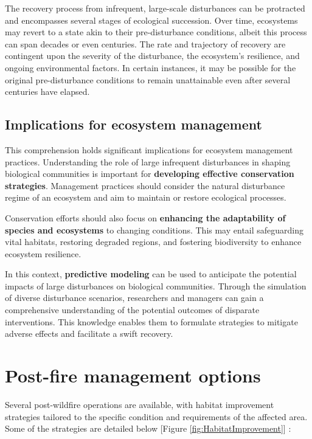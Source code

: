\documentclass[
  12 pt,
]{Nemilov}
\begin{document}
The recovery process from infrequent, large-scale disturbances can be protracted and encompasses several stages of ecological succession. Over time, ecosystems may revert to a state akin to their pre-disturbance conditions, albeit this process can span decades or even centuries. The rate and trajectory of recovery are contingent upon the severity of the disturbance, the ecosystem's resilience, and ongoing environmental factors. In certain instances, it may be possible for the original pre-disturbance conditions to remain unattainable even after several centuries have elapsed.

\subsection{Implications for ecosystem management}\label{implications-for-ecosystem-management}

This comprehension holds significant implications for ecosystem management practices. Understanding the role of large infrequent disturbances in shaping biological communities is important for \textbf{developing effective conservation strategies}. Management practices should consider the natural disturbance regime of an ecosystem and aim to maintain or restore ecological processes.

Conservation efforts should also focus on \textbf{enhancing the adaptability of species and ecosystems} to changing conditions. This may entail safeguarding vital habitats, restoring degraded regions, and fostering biodiversity to enhance ecosystem resilience.

In this context, \textbf{predictive modeling} can be used to anticipate the potential impacts of large disturbances on biological communities. Through the simulation of diverse disturbance scenarios, researchers and managers can gain a comprehensive understanding of the potential outcomes of disparate interventions. This knowledge enables them to formulate strategies to mitigate adverse effects and facilitate a swift recovery.

\section{Post-fire management options}\label{post-fire-management-options}

Several post-wildfire operations are available, with habitat improvement strategies tailored to the specific condition and requirements of the affected area. Some of the strategies are detailed below {[}Figure \ref{fig:HabitatImprovement}{]} \citep{awadhiya2021principles}:
\end{document}
